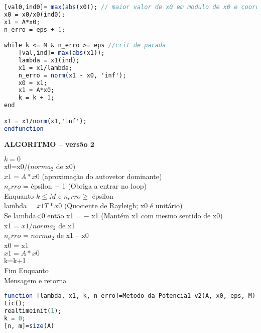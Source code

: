 \documentclass[leqno]{article}
\numberwithin{equation}{section}
\begin{document}
\begin{enumerate}
\begin{sol}
\begin{lstlisting}[style=mystyle, language=Scilab]
[val0,ind0]= max(abs(x0)); // maior valor de x0 em modulo de x0 e coordenada
x0 = x0/x0(ind0);
x1 = A*x0;
n_erro = eps + 1;

while k <= M & n_erro >= eps //crit de parada
	[val,ind]= max(abs(x1));
	lambda = x1(ind);
	x1 = x1/lambda;
	n_erro = norm(x1 - x0, 'inf');
	x0 = x1;
	x1 = A*x0;
	k = k + 1;
end

x1 = x1/norm(x1,'inf');
endfunction
			\end{lstlisting}
			
		\end{sol}
		
		\textbf{{\large ALGORITMO – versão 2}}\\
		\begin{tcolorbox}[colback=gray!5,colframe=gray!40!black]
		$k=0$\\
		x0=x0/($norma_2$ de x0)\\
		$x1=A*x0$ (aproximação do autovetor dominante)\\
		$n_erro$ = épsilon + 1 (Obriga a entrar no loop)\\
		Enquanto $k \leq M$ e $n_erro \geq$ épsilon\\
		\hspace*{3ex}	lambda = $x1T*x0$ (Quociente de Rayleigh; x0 é unitário)\\
		\hspace*{3ex}	Se lambda<0 então x1 = − x1 (Mantém x1 com mesmo sentido de x0)\\
		\hspace*{3ex}	x1 = $x1/norma_2$ de x1\\
		\hspace*{3ex}	$n_erro$ = $norma_2$ de x1 – x0\\
		\hspace*{3ex}	x0 = x1\\
		\hspace*{3ex}	$x1=A*x0$\\
		\hspace*{3ex}	k=k+1\\
		Fim Enquanto\\
		Mensagem e retorna\\
		\end{tcolorbox}
	
		\begin{sol}
		\begin{lstlisting}[language=Scilab]
function [lambda, x1, k, n_erro]=Metodo_da_Potencia1_v2(A, x0, eps, M)
tic();
realtimeinit(1);
k = 0;
[n, m]=size(A)


\end{lstlisting}
\end{sol}
\end{enumerate}
\end{document}
